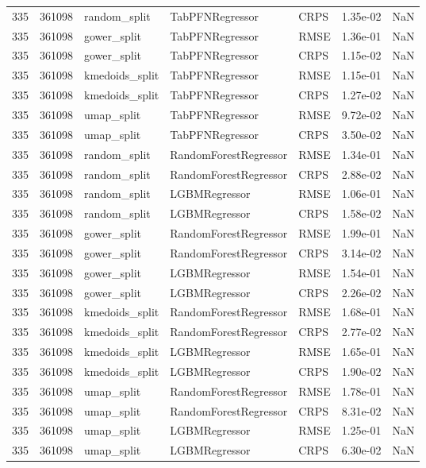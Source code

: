 \begin{tabular}{rrlllrr}
335 & 361098 & random\_split & TabPFNRegressor & CRPS & 1.35e-02 & NaN \\
335 & 361098 & gower\_split & TabPFNRegressor & RMSE & 1.36e-01 & NaN \\
335 & 361098 & gower\_split & TabPFNRegressor & CRPS & 1.15e-02 & NaN \\
335 & 361098 & kmedoids\_split & TabPFNRegressor & RMSE & 1.15e-01 & NaN \\
335 & 361098 & kmedoids\_split & TabPFNRegressor & CRPS & 1.27e-02 & NaN \\
335 & 361098 & umap\_split & TabPFNRegressor & RMSE & 9.72e-02 & NaN \\
335 & 361098 & umap\_split & TabPFNRegressor & CRPS & 3.50e-02 & NaN \\
335 & 361098 & random\_split & RandomForestRegressor & RMSE & 1.34e-01 & NaN \\
335 & 361098 & random\_split & RandomForestRegressor & CRPS & 2.88e-02 & NaN \\
335 & 361098 & random\_split & LGBMRegressor & RMSE & 1.06e-01 & NaN \\
335 & 361098 & random\_split & LGBMRegressor & CRPS & 1.58e-02 & NaN \\
335 & 361098 & gower\_split & RandomForestRegressor & RMSE & 1.99e-01 & NaN \\
335 & 361098 & gower\_split & RandomForestRegressor & CRPS & 3.14e-02 & NaN \\
335 & 361098 & gower\_split & LGBMRegressor & RMSE & 1.54e-01 & NaN \\
335 & 361098 & gower\_split & LGBMRegressor & CRPS & 2.26e-02 & NaN \\
335 & 361098 & kmedoids\_split & RandomForestRegressor & RMSE & 1.68e-01 & NaN \\
335 & 361098 & kmedoids\_split & RandomForestRegressor & CRPS & 2.77e-02 & NaN \\
335 & 361098 & kmedoids\_split & LGBMRegressor & RMSE & 1.65e-01 & NaN \\
335 & 361098 & kmedoids\_split & LGBMRegressor & CRPS & 1.90e-02 & NaN \\
335 & 361098 & umap\_split & RandomForestRegressor & RMSE & 1.78e-01 & NaN \\
335 & 361098 & umap\_split & RandomForestRegressor & CRPS & 8.31e-02 & NaN \\
335 & 361098 & umap\_split & LGBMRegressor & RMSE & 1.25e-01 & NaN \\
335 & 361098 & umap\_split & LGBMRegressor & CRPS & 6.30e-02 & NaN \\

\end{tabular}

